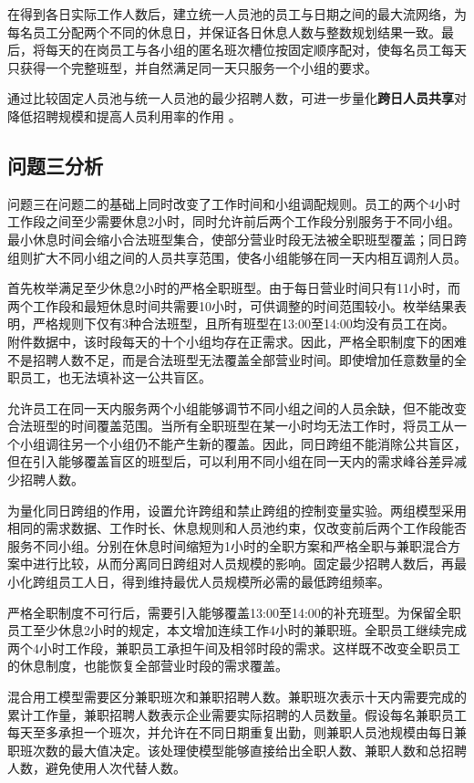 \documentclass[withoutpreface,bwprint]{cumcmthesis}
\begin{document}
在得到各日实际工作人数后，建立统一人员池的员工与日期之间的最大流网络，为每名员工分配两个不同的休息日，并保证各日休息人数与整数规划结果一致。最后，将每天的在岗员工与各小组的匿名班次槽位按固定顺序配对，使每名员工每天只获得一个完整班型，并自然满足同一天只服务一个小组的要求。

通过比较固定人员池与统一人员池的最少招聘人数，可进一步量化\textbf{跨日人员共享}对降低招聘规模和提高人员利用率的作用
\cite{hopp2004skill,taskiran2017cross}。

\subsection{问题三分析}

问题三在问题二的基础上同时改变了工作时间和小组调配规则。员工的两个4小时工作段之间至少需要休息2小时，同时允许前后两个工作段分别服务于不同小组。最小休息时间会缩小合法班型集合，使部分营业时段无法被全职班型覆盖；同日跨组则扩大不同小组之间的人员共享范围，使各小组能够在同一天内相互调剂人员。

首先枚举满足至少休息2小时的严格全职班型。由于每日营业时间只有11小时，而两个工作段和最短休息时间共需要10小时，可供调整的时间范围较小。枚举结果表明，严格规则下仅有3种合法班型，且所有班型在13:00至14:00均没有员工在岗。附件数据中，该时段每天的十个小组均存在正需求。因此，严格全职制度下的困难不是招聘人数不足，而是合法班型无法覆盖全部营业时间。即使增加任意数量的全职员工，也无法填补这一公共盲区。

允许员工在同一天内服务两个小组能够调节不同小组之间的人员余缺，但不能改变合法班型的时间覆盖范围。当所有全职班型在某一小时均无法工作时，将员工从一个小组调往另一个小组仍不能产生新的覆盖。因此，同日跨组不能消除公共盲区，但在引入能够覆盖盲区的班型后，可以利用不同小组在同一天内的需求峰谷差异减少招聘人数。

为量化同日跨组的作用，设置允许跨组和禁止跨组的控制变量实验。两组模型采用相同的需求数据、工作时长、休息规则和人员池约束，仅改变前后两个工作段能否服务不同小组。分别在休息时间缩短为1小时的全职方案和严格全职与兼职混合方案中进行比较，从而分离同日跨组对人员规模的影响。固定最少招聘人数后，再最小化跨组员工人日，得到维持最优人员规模所必需的最低跨组频率。

严格全职制度不可行后，需要引入能够覆盖13:00至14:00的补充班型。为保留全职员工至少休息2小时的规定，本文增加连续工作4小时的兼职班。全职员工继续完成两个4小时工作段，兼职员工承担午间及相邻时段的需求。这样既不改变全职员工的休息制度，也能恢复全部营业时段的需求覆盖。

混合用工模型需要区分兼职班次和兼职招聘人数。兼职班次表示十天内需要完成的累计工作量，兼职招聘人数表示企业需要实际招聘的人员数量。假设每名兼职员工每天至多承担一个班次，并允许在不同日期重复出勤，则兼职人员池规模由每日兼职班次数的最大值决定。该处理使模型能够直接给出全职人数、兼职人数和总招聘人数，避免使用人次代替人数。
\end{document}
